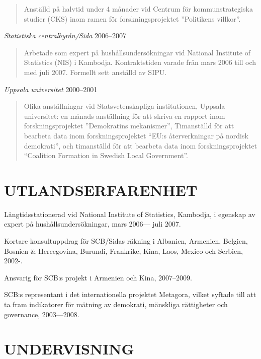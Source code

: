\documentclass[11pt,]{article}
\begin{document}
\begin{quote}
Anställd på halvtid under 4 månader vid Centrum för kommunstrategiska
studier (CKS) inom ramen för forskningsprojektet ''Politikens villkor''.
\end{quote}

\emph{Statistiska centralbyrån/Sida} \hfill 2006--2007

\begin{quote}
Arbetade som expert på hushållsundersökningar vid National Institute of
Statistics (NIS) i Kambodja. Kontraktstiden varade från mars 2006 till
och med juli 2007. Formellt sett anställd av SIPU.
\end{quote}

\emph{Uppsala universitet} \hfill 2000--2001

\begin{quote}
Olika anställningar vid Statsvetenskapliga institutionen, Uppsala
universitet: en månads anställning för att skriva en rapport inom
forskningsprojektet ''Demokratins mekanismer'', Timanställd för att
bearbeta data inom forskningsprojektet ``EU:s återverkningar på nordisk
demokrati'', och timanställd för att bearbeta data inom
forskningsprojektet ``Coalition Formation in Swedish Local Government''.
\end{quote}

\hypertarget{utlandserfarenhet}{%
\section{UTLANDSERFARENHET}\label{utlandserfarenhet}}

Långtidsstationerad vid National Institute of Statistics, Kambodja, i
egenskap av expert på hushållsundersökningar, mars 2006--- juli 2007.

Kortare konsultuppdrag för SCB/Sidas räkning i Albanien, Armenien,
Belgien, Bosnien \& Hercegovina, Burundi, Frankrike, Kina, Laos, Mexico
och Serbien, 2002-.

Ansvarig för SCB:s projekt i Armenien och Kina, 2007--2009.

SCB:s representant i det internationella projektet Metagora, vilket
syftade till att ta fram indikatorer för mätning av demokrati, mänskliga
rättigheter och governance, 2003---2008.

\hypertarget{undervisning}{%
\section{UNDERVISNING}\label{undervisning}}
\end{document}
